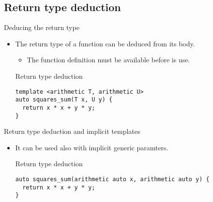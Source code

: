 \subsection{Return type deduction} 

\begin{frame}[t,fragile]{Deducing the return type}
\begin{itemize}
  \item The return type of a function can be deduced from its body.
    \begin{itemize}
      \item The function definition must be available before is use.
    \end{itemize}

\begin{block}{Return type deduction}
\begin{lstlisting}
template <arithmetic T, arithmetic U>
auto squares_sum(T x, U y) {
  return x * x + y * y;
}
\end{lstlisting}
\end{block}

\end{itemize}
\end{frame}

\begin{frame}[t,fragile]{Return type deduction and implicit templates}
\begin{itemize}
  \item It can be used also with implicit generic paramters.

\begin{block}{Return type deduction}
\begin{lstlisting}
auto squares_sum(arithmetic auto x, arithmetic auto y) {
  return x * x + y * y;
}
\end{lstlisting}
\end{block}

\end{itemize}
\end{frame}

